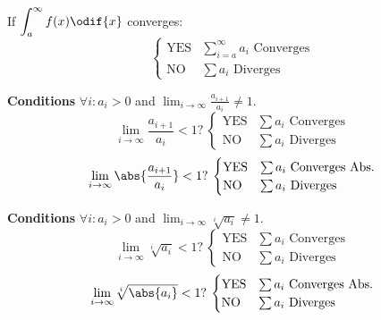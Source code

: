 \documentclass{article}
\begin{document}
\begin{multicols}{2}
\begin{tcolorboxcols}[title={Integral Test}]
        \noindent If \(\displaystyle\int_a^\infty f(x) \odif{x}\) converges:
        \begin{equation*}
            \begin{cases}
                \text{YES} & \text{\(\sum_{i=a}^\infty a_i\) Converges} \\
                \text{NO}  & \text{\(\sum a_i\) Diverges}
            \end{cases}
        \end{equation*}
    \end{tcolorboxcols}
    \begin{tcolorboxcols}[title={Ratio Test}]
        \textbf{Conditions} \(\forall i:a_i>0\) and \(\displaystyle \lim_{i\to\infty}\frac{a_{i+1}}{a_i}\neq 1\).
        \begin{equation*}
            \text{\(\lim_{i\to\infty}\frac{a_{i+1}}{a_i} < 1\)?}\:
            \begin{cases}
                \text{YES} & \text{\(\sum a_i\) Converges} \\
                \text{NO}  & \text{\(\sum a_i\) Diverges}
            \end{cases}
        \end{equation*}
        \begin{equation*}
            \text{\(\lim_{i\to\infty}\abs{\frac{a_{i+1}}{a_i}} < 1\)?}\:
            \begin{cases}
                \text{YES} & \text{\(\sum a_i\) Converges Abs.} \\
                \text{NO}  & \text{\(\sum a_i\) Diverges}
            \end{cases}
        \end{equation*}
    \end{tcolorboxcols}
    \begin{tcolorboxcols}[title={Root Test}]
        \textbf{Conditions} \(\forall i:a_i>0\) and \(\displaystyle \lim_{i\to\infty}\sqrt[i]{a_i}\neq 1\).
        \begin{equation*}
            \text{\(\lim_{i\to\infty}\sqrt[i]{a_i} < 1\)?}\:
            \begin{cases}
                \text{YES} & \text{\(\sum a_i\) Converges} \\
                \text{NO}  & \text{\(\sum a_i\) Diverges}
            \end{cases}
        \end{equation*}
        \begin{equation*}
            \text{\(\lim_{i\to\infty}\sqrt[i]{\abs{a_i}} < 1\)?}\:
            \begin{cases}
                \text{YES} & \text{\(\sum a_i\) Converges Abs.} \\
                \text{NO}  & \text{\(\sum a_i\) Diverges}
            \end{cases}
        \end{equation*}
    \end{tcolorboxcols}
\end{multicols}
\pagebreak
%
\end{document}
